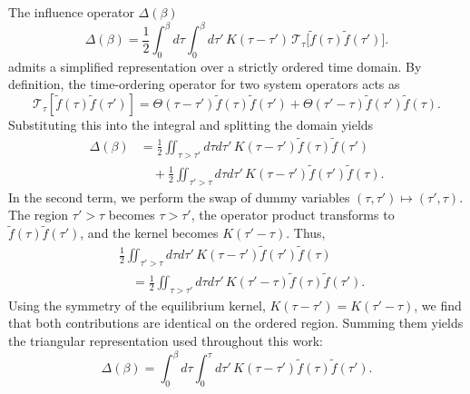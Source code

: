 The influence operator $\Delta(\beta)$ 
\begin{equation}
    \Delta(\beta) = \frac{1}{2} \int_0^\beta d\tau \int_0^\beta d\tau' \, K(\tau-\tau') \, \mathcal{T}_\tau \big[ \tilde{f}(\tau) \tilde{f}(\tau') \big].
\end{equation}
 admits a simplified representation over a strictly ordered time domain. By definition, the time-ordering operator for two system operators acts as
\begin{equation}
    \mathcal{T}_\tau \left[ \tilde{f}(\tau) \tilde{f}(\tau') \right] = \Theta(\tau-\tau') \tilde{f}(\tau) \tilde{f}(\tau') + \Theta(\tau'-\tau) \tilde{f}(\tau') \tilde{f}(\tau).
\end{equation}
Substituting this into the integral and splitting the domain yields
\begin{equation}
    \begin{split}
        \Delta(\beta) &= \frac{1}{2} \iint_{\tau > \tau'} d\tau d\tau' \, K(\tau-\tau') \tilde{f}(\tau) \tilde{f}(\tau') \\
        &\quad + \frac{1}{2} \iint_{\tau' > \tau} d\tau d\tau' \, K(\tau-\tau') \tilde{f}(\tau') \tilde{f}(\tau).
    \end{split}
\end{equation}
In the second term, we perform the swap of dummy variables $(\tau, \tau') \mapsto (\tau', \tau)$. The region $\tau' > \tau$ becomes $\tau > \tau'$, the operator product transforms to $\tilde{f}(\tau) \tilde{f}(\tau')$, and the kernel becomes $K(\tau'-\tau)$. Thus,
\begin{equation}
    \begin{split}
        &\frac{1}{2} \iint_{\tau' > \tau} d\tau d\tau' \, K(\tau-\tau') \tilde{f}(\tau') \tilde{f}(\tau) \\
        &\quad = \frac{1}{2} \iint_{\tau > \tau'} d\tau d\tau' \, K(\tau'-\tau) \tilde{f}(\tau) \tilde{f}(\tau').
    \end{split}
\end{equation}
Using the symmetry of the equilibrium kernel, $K(\tau-\tau') = K(\tau'-\tau)$, we find that both contributions are identical on the ordered region. Summing them yields the triangular representation used throughout this work:
\begin{equation}
    \Delta(\beta) = \int_0^\beta d\tau \int_0^\tau d\tau' \, K(\tau-\tau') \tilde{f}(\tau) \tilde{f}(\tau').
\end{equation}


